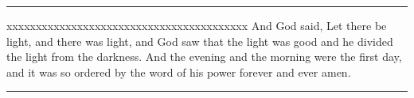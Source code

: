 \documentclass[11pt]{article}
\begin{document}
\parindent=0pt
\setlength{\columnwidth}{45mm}\setlength{\hsize}{45mm}\linewidth=45mm
\noindent\rule{45mm}{0.4pt}\par
\begin{scripture}
xxxxxxxxxxxxxxxxxxxxxxxxxxxxxxxxxxxxxxxxx
And God said, Let there be light, and there was light, and God
saw that the light was good and he divided the light from the darkness.
And the evening and the morning were the first day, and it was so
ordered by the word of his power forever and ever amen.
\end{scripture}
\noindent\rule{45mm}{0.4pt}\par
\end{document}
